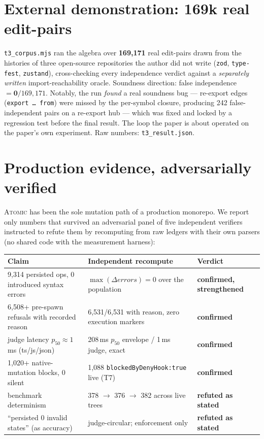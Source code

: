 \section{External demonstration: 169k real edit-pairs}\label{sec:t3}

\texttt{t3\_corpus.mjs} ran the algebra over \textbf{169{,}171} real edit-pairs
drawn from the histories of three open-source repositories the author did not
write (\texttt{zod}, \texttt{type-fest}, \texttt{zustand}), cross-checking every
independence verdict against a \emph{separately written} import-reachability
oracle. Soundness direction: false independence $=\mathbf{0}/169{,}171$.
Notably, the run \emph{found} a real soundness bug --- re-export edges
(\texttt{export \ldots\ from}) were missed by the per-symbol closure, producing
242 false-independent pairs on a re-export hub --- which was fixed and locked by
a regression test before the final result. The loop the paper is about operated
on the paper's own experiment. Raw numbers: \texttt{t3\_result.json}.

\section{Production evidence, adversarially verified}\label{sec:production}

\textsc{Atomic} has been the sole mutation path of a production monorepo. We
report only numbers that survived an adversarial panel of five independent
verifiers instructed to refute them by recomputing from raw ledgers with their
own parsers (no shared code with the measurement harness):

\begin{center}
\begin{tabular}{lll}
\toprule
Claim & Independent recompute & Verdict\\
\midrule
9{,}314 persisted ops, 0 introduced syntax errors &
$\max(\Delta\mathit{errors})=0$ over the population &
\textbf{confirmed, strengthened}\\
6{,}508+ pre-spawn refusals with recorded reason &
6{,}531/6{,}531 with reason, zero execution markers &
\textbf{confirmed}\\
judge latency $p_{50}\!\approx\!1$\,ms (ts/js/json) &
208\,ms $p_{50}$ envelope / 1\,ms judge, exact &
\textbf{confirmed}\\
1{,}020+ native-mutation blocks, 0 silent &
1{,}088 \texttt{blockedByDenyHook:true} live (T7) &
\textbf{confirmed}\\
benchmark determinism &
378 $\to$ 376 $\to$ 382 across live trees &
\textbf{refuted as stated}\\
``persisted 0 invalid states'' (as accuracy) &
judge-circular; enforcement only &
\textbf{refuted as stated}\\
\bottomrule
\end{tabular}
\end{center}

